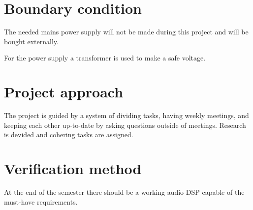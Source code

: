 \section{Boundary condition}

The needed mains power supply will not be made during this project and will be bought externally.

\noindent For the power supply a transformer is used to make a safe voltage.


\section{Project approach}

The project is guided by a system of dividing tasks, having weekly meetings, and keeping each other up-to-date by asking questions outside of meetings. Research is devided and cohering tasks are assigned.

\section{Verification method}

At the end of the semester there should be a working audio DSP capable of the must-have requirements. 

